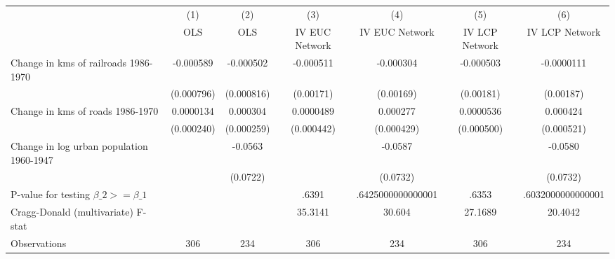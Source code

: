 {
\def\sym#1{\ifmmode^{#1}\else\(^{#1}\)\fi}
\begin{tabular}{l*{6}{c}}
\hline\hline
                &\multicolumn{1}{c}{(1)}&\multicolumn{1}{c}{(2)}&\multicolumn{1}{c}{(3)}&\multicolumn{1}{c}{(4)}&\multicolumn{1}{c}{(5)}&\multicolumn{1}{c}{(6)}\\
                &\multicolumn{1}{c}{OLS}&\multicolumn{1}{c}{OLS}&\multicolumn{1}{c}{IV EUC Network}&\multicolumn{1}{c}{IV EUC Network}&\multicolumn{1}{c}{IV LCP Network}&\multicolumn{1}{c}{IV LCP Network}\\
\hline
Change in kms of railroads 1986-1970&-0.000589         &-0.000502         &-0.000511         &-0.000304         &-0.000503         &-0.0000111         \\
                &(0.000796)         &(0.000816)         &(0.00171)         &(0.00169)         &(0.00181)         &(0.00187)         \\
[1em]
Change in kms of roads 1986-1970&0.0000134         & 0.000304         &0.0000489         & 0.000277         &0.0000536         & 0.000424         \\
                &(0.000240)         &(0.000259)         &(0.000442)         &(0.000429)         &(0.000500)         &(0.000521)         \\
[1em]
Change in log urban population 1960-1947&                  &  -0.0563         &                  &  -0.0587         &                  &  -0.0580         \\
                &                  & (0.0722)         &                  & (0.0732)         &                  & (0.0732)         \\
\hline
P-value for testing $\beta\_{2} >= \beta\_{1}$&                  &                  &    .6391         &.6425000000000001         &    .6353         &.6032000000000001         \\
Cragg-Donald (multivariate) F-stat&                  &                  &  35.3141         &   30.604         &  27.1689         &  20.4042         \\
Observations    &      306         &      234         &      306         &      234         &      306         &      234         \\
\hline\hline
\end{tabular}
}
